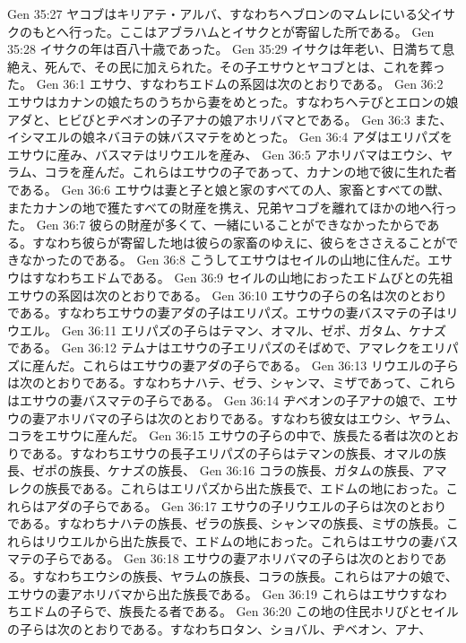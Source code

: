 Gen 35:27  ヤコブはキリアテ・アルバ、すなわちヘブロンのマムレにいる父イサクのもとへ行った。ここはアブラハムとイサクとが寄留した所である。
Gen 35:28  イサクの年は百八十歳であった。
Gen 35:29  イサクは年老い、日満ちて息絶え、死んで、その民に加えられた。その子エサウとヤコブとは、これを葬った。
Gen 36:1  エサウ、すなわちエドムの系図は次のとおりである。
Gen 36:2  エサウはカナンの娘たちのうちから妻をめとった。すなわちヘテびとエロンの娘アダと、ヒビびとヂベオンの子アナの娘アホリバマとである。
Gen 36:3  また、イシマエルの娘ネバヨテの妹バスマテをめとった。
Gen 36:4  アダはエリパズをエサウに産み、バスマテはリウエルを産み、
Gen 36:5  アホリバマはエウシ、ヤラム、コラを産んだ。これらはエサウの子であって、カナンの地で彼に生れた者である。
Gen 36:6  エサウは妻と子と娘と家のすべての人、家畜とすべての獣、またカナンの地で獲たすべての財産を携え、兄弟ヤコブを離れてほかの地へ行った。
Gen 36:7  彼らの財産が多くて、一緒にいることができなかったからである。すなわち彼らが寄留した地は彼らの家畜のゆえに、彼らをささえることができなかったのである。
Gen 36:8  こうしてエサウはセイルの山地に住んだ。エサウはすなわちエドムである。
Gen 36:9  セイルの山地におったエドムびとの先祖エサウの系図は次のとおりである。
Gen 36:10  エサウの子らの名は次のとおりである。すなわちエサウの妻アダの子はエリパズ。エサウの妻バスマテの子はリウエル。
Gen 36:11  エリパズの子らはテマン、オマル、ゼポ、ガタム、ケナズである。
Gen 36:12  テムナはエサウの子エリパズのそばめで、アマレクをエリパズに産んだ。これらはエサウの妻アダの子らである。
Gen 36:13  リウエルの子らは次のとおりである。すなわちナハテ、ゼラ、シャンマ、ミザであって、これらはエサウの妻バスマテの子らである。
Gen 36:14  ヂベオンの子アナの娘で、エサウの妻アホリバマの子らは次のとおりである。すなわち彼女はエウシ、ヤラム、コラをエサウに産んだ。
Gen 36:15  エサウの子らの中で、族長たる者は次のとおりである。すなわちエサウの長子エリパズの子らはテマンの族長、オマルの族長、ゼポの族長、ケナズの族長、
Gen 36:16  コラの族長、ガタムの族長、アマレクの族長である。これらはエリパズから出た族長で、エドムの地におった。これらはアダの子らである。
Gen 36:17  エサウの子リウエルの子らは次のとおりである。すなわちナハテの族長、ゼラの族長、シャンマの族長、ミザの族長。これらはリウエルから出た族長で、エドムの地におった。これらはエサウの妻バスマテの子らである。
Gen 36:18  エサウの妻アホリバマの子らは次のとおりである。すなわちエウシの族長、ヤラムの族長、コラの族長。これらはアナの娘で、エサウの妻アホリバマから出た族長である。
Gen 36:19  これらはエサウすなわちエドムの子らで、族長たる者である。
Gen 36:20  この地の住民ホリびとセイルの子らは次のとおりである。すなわちロタン、ショバル、ヂベオン、アナ、
